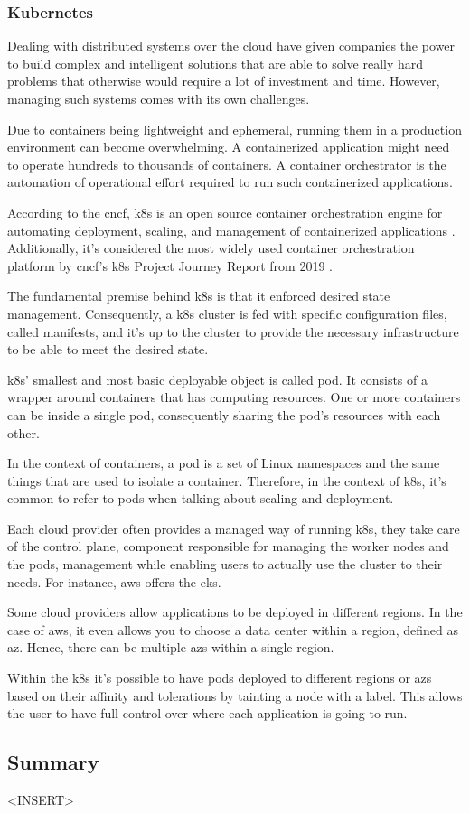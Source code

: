 \subsubsection{Kubernetes}

Dealing with distributed systems over the cloud have given companies the power to build complex and intelligent solutions that are able to solve really hard problems that otherwise would require a lot of investment and time. However, managing such systems comes with its own challenges.

Due to containers being lightweight and ephemeral, running them in a production environment can become overwhelming. A containerized application might need to operate hundreds to thousands of containers. A container orchestrator is the automation of operational effort required to run such containerized applications.

According to the \gls{cncf}, \gls{k8s} is an open source container orchestration engine for automating deployment, scaling, and management of containerized applications \cite{kubernetes}. Additionally, it’s considered the most widely used container orchestration platform by \gls{cncf}’s \gls{k8s} Project Journey Report from 2019 \cite{cncf_k8s_report}.

The fundamental premise behind \gls{k8s} is that it enforced desired state management. Consequently, a \gls{k8s} cluster is fed with specific configuration files, called manifests, and it's up to the cluster to provide the necessary infrastructure to be able to meet the desired state.

\gls{k8s}’ smallest and most basic deployable object is called pod. It consists of a wrapper around containers that has computing resources. One or more containers can be inside a single pod, consequently sharing the pod’s resources with each other.

In the context of containers, a pod is a set of Linux namespaces and the same things that are used to isolate a container. Therefore, in the context of \gls{k8s}, it’s common to refer to pods when talking about scaling and deployment.

Each cloud provider often provides a managed way of running \gls{k8s}, they take care of the control plane, component responsible for managing the worker nodes and the pods, management while enabling users to actually use the cluster to their needs. For instance, \gls{aws} offers the \gls{eks}.

Some cloud providers allow applications to be deployed in different regions. In the case of \gls{aws}, it even allows you to choose a data center within a region, defined as \gls{az}. Hence, there can be multiple \gls{az}s within a single region.

Within the \gls{k8s} it’s possible to have pods deployed to different regions or \gls{az}s based on their affinity and tolerations by tainting a node with a label. This allows the user to have full control over where each application is going to run.

\subsection{Summary}

<INSERT>
